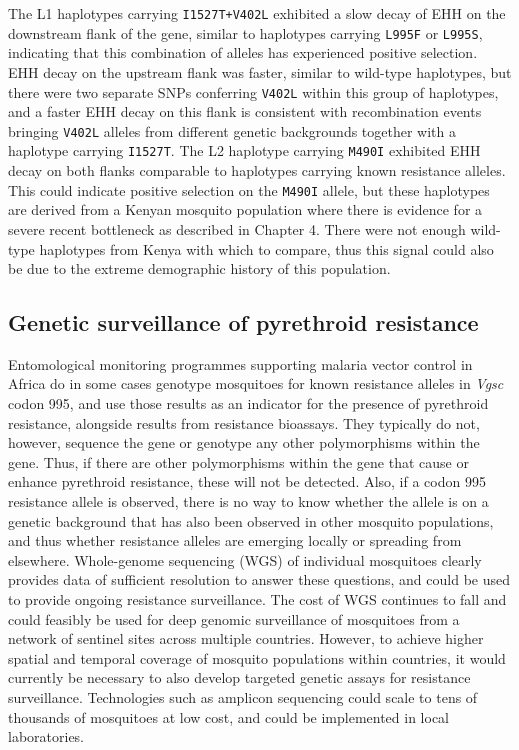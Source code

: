\begin{refsection}
The L1 haplotypes carrying \texttt{I1527T+V402L} exhibited a slow decay of EHH on the downstream flank of the gene, similar to haplotypes carrying \texttt{L995F} or \texttt{L995S}, indicating that this combination of alleles has experienced positive selection.
%
EHH decay on the upstream flank was faster, similar to wild-type haplotypes, but there were two separate SNPs conferring \texttt{V402L} within this group of haplotypes, and a faster EHH decay on this flank is consistent with recombination events bringing \texttt{V402L} alleles from different genetic backgrounds together with a haplotype carrying \texttt{I1527T}.
%
The L2 haplotype carrying \texttt{M490I} exhibited EHH decay on both flanks comparable to haplotypes carrying known resistance alleles.
%
This could indicate positive selection on the \texttt{M490I} allele, but these haplotypes are derived from a Kenyan mosquito population where there is evidence for a severe recent bottleneck as described in Chapter 4.
%
There were not enough wild-type haplotypes from Kenya with which to compare, thus this signal could also be due to the extreme demographic history of this population.


\subsection{Genetic surveillance of pyrethroid resistance}\label{subsec:results-tracking}


Entomological monitoring programmes supporting malaria vector control in Africa do in some cases genotype mosquitoes for known resistance alleles in \textit{Vgsc} codon 995, and use those results as an indicator for the presence of pyrethroid resistance, alongside results from resistance bioassays.
%
They typically do not, however, sequence the gene or genotype any other polymorphisms within the gene.
%
Thus, if there are other polymorphisms within the gene that cause or enhance pyrethroid resistance, these will not be detected.
%
Also, if a codon 995 resistance allele is observed, there is no way to know whether the allele is on a genetic background that has also been observed in other mosquito populations, and thus whether resistance alleles are emerging locally or spreading from elsewhere.
%
Whole-genome sequencing (WGS) of individual mosquitoes clearly provides data of sufficient resolution to answer these questions, and could be used to provide ongoing resistance surveillance.
%
The cost of WGS continues to fall and could feasibly be used for deep genomic surveillance of mosquitoes from a network of sentinel sites across multiple countries.
%
However, to achieve higher spatial and temporal coverage of mosquito populations within countries, it would currently be necessary to also develop targeted genetic assays for resistance surveillance.
%
Technologies such as amplicon sequencing could scale to tens of thousands of mosquitoes at low cost, and could be implemented in local laboratories.



\end{refsection}
